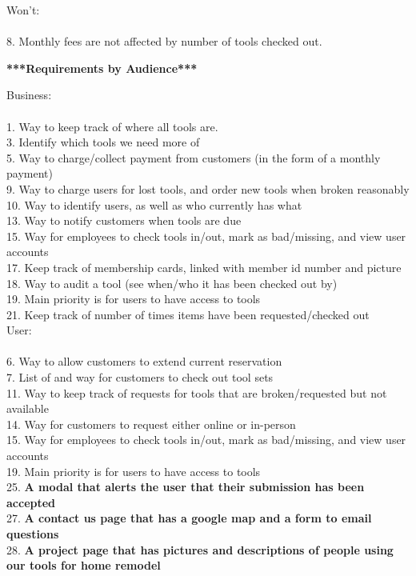 \documentclass[12pt,letterpaper]{article}
\begin{document}
Won't:\\\\
8. Monthly fees are not affected by number of tools checked out.

\newpage
\textbf{***Requirements by Audience***}

Business:\\\\
1. Way to keep track of where all tools are.\\
3. Identify which tools we need more of\\
5. Way to charge/collect payment from customers (in the form of a monthly payment)\\
9. Way to charge users for lost tools, and order new tools when broken reasonably\\
10. Way to identify users, as well as who currently has what\\
13. Way to notify customers when tools are due\\
15. Way for employees to check tools in/out, mark as bad/missing, and view user accounts\\
17. Keep track of membership cards, linked with member id number and picture\\
18. Way to audit a tool (see when/who it has been checked out by)\\
19. Main priority is for users to have access to tools\\
21. Keep track of number of times items have been requested/checked out\\

User:\\\\
6. Way to allow customers to extend current reservation\\
7. List of and way for customers to check out tool sets\\
11. Way to keep track of requests for tools that are broken/requested but not available\\
14. Way for customers to request either online or in-person\\
15. Way for employees to check tools in/out, mark as bad/missing, and view user accounts\\
19. Main priority is for users to have access to tools\\
25. \textbf{A modal that alerts the user that their submission has been accepted}\\
27. \textbf{A contact us page that has a google map and a form to email questions}\\
28. \textbf{A project page that has pictures and descriptions of people using our tools for home remodel }
\end{document}
